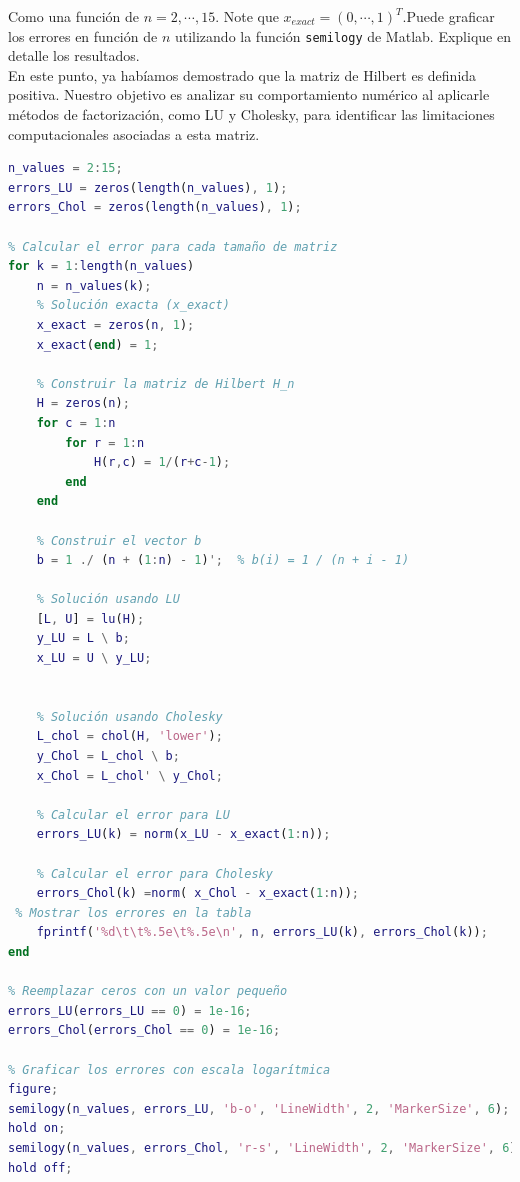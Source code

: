 \begin{homeworkProblem}
\begin{solucion}
\begin{enumerate}[a)]
        Como una función de $n=2,\cdots, 15.$ Note que $x_{exact}=(0,\cdots,1)^T.$Puede graficar los errores en función de $n$ utilizando la función \texttt{semilogy} de Matlab. Explique en detalle los resultados.\\
          En este punto, ya habíamos demostrado que la matriz de Hilbert es definida positiva. Nuestro objetivo es analizar su comportamiento numérico al aplicarle métodos de factorización, como LU y Cholesky, para identificar las limitaciones computacionales asociadas a esta matriz.
          \begin{lstlisting}[language=matlab]
% Rango de tamaños de matriz
n_values = 2:15;
errors_LU = zeros(length(n_values), 1);
errors_Chol = zeros(length(n_values), 1);

% Calcular el error para cada tamaño de matriz
for k = 1:length(n_values)
    n = n_values(k);
    % Solución exacta (x_exact)
    x_exact = zeros(n, 1);
    x_exact(end) = 1;
    
    % Construir la matriz de Hilbert H_n
    H = zeros(n);
    for c = 1:n
        for r = 1:n
            H(r,c) = 1/(r+c-1);
        end
    end
    
    % Construir el vector b
    b = 1 ./ (n + (1:n) - 1)';  % b(i) = 1 / (n + i - 1)
    
    % Solución usando LU
    [L, U] = lu(H);
    y_LU = L \ b;
    x_LU = U \ y_LU;

    
    % Solución usando Cholesky
    L_chol = chol(H, 'lower');
    y_Chol = L_chol \ b;
    x_Chol = L_chol' \ y_Chol;
    
    % Calcular el error para LU
    errors_LU(k) = norm(x_LU - x_exact(1:n));

    % Calcular el error para Cholesky
    errors_Chol(k) =norm( x_Chol - x_exact(1:n));
 % Mostrar los errores en la tabla
    fprintf('%d\t\t%.5e\t%.5e\n', n, errors_LU(k), errors_Chol(k));
end

% Reemplazar ceros con un valor pequeño
errors_LU(errors_LU == 0) = 1e-16;
errors_Chol(errors_Chol == 0) = 1e-16;

% Graficar los errores con escala logarítmica
figure;
semilogy(n_values, errors_LU, 'b-o', 'LineWidth', 2, 'MarkerSize', 6);
hold on;
semilogy(n_values, errors_Chol, 'r-s', 'LineWidth', 2, 'MarkerSize', 6);
hold off;


\end{lstlisting}
\end{enumerate}
\end{solucion}
\end{homeworkProblem}
